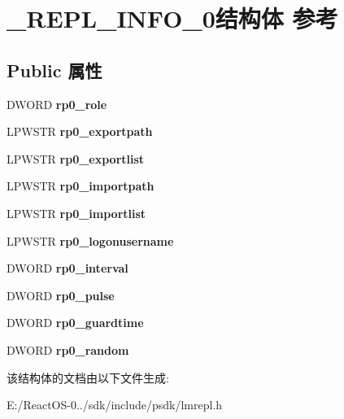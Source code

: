 \hypertarget{struct___r_e_p_l___i_n_f_o__0}{}\section{\+\_\+\+R\+E\+P\+L\+\_\+\+I\+N\+F\+O\+\_\+0结构体 参考}
\label{struct___r_e_p_l___i_n_f_o__0}
\subsection*{Public 属性}
\begin{DoxyCompactItemize}
\item 
\mbox{\label{struct___r_e_p_l___i_n_f_o__0_aadaf7408b2a19020001567cff8b2bb4c}} 
D\+W\+O\+RD {\bfseries rp0\+\_\+role}
\item 
\mbox{\label{struct___r_e_p_l___i_n_f_o__0_a6e6c5561532a9246d10c3d4e387ad61d}} 
L\+P\+W\+S\+TR {\bfseries rp0\+\_\+exportpath}
\item 
\mbox{\label{struct___r_e_p_l___i_n_f_o__0_a2ff180c58fb39f63bc7f042bc0798658}} 
L\+P\+W\+S\+TR {\bfseries rp0\+\_\+exportlist}
\item 
\mbox{\label{struct___r_e_p_l___i_n_f_o__0_afb46bc038e14ba10806d49d3f6782cf6}} 
L\+P\+W\+S\+TR {\bfseries rp0\+\_\+importpath}
\item 
\mbox{\label{struct___r_e_p_l___i_n_f_o__0_a2af370ed3b6af34101ce90a5522e3b5f}} 
L\+P\+W\+S\+TR {\bfseries rp0\+\_\+importlist}
\item 
\mbox{\label{struct___r_e_p_l___i_n_f_o__0_a53abb8e9b4ad3f83ef26eeb7600c803e}} 
L\+P\+W\+S\+TR {\bfseries rp0\+\_\+logonusername}
\item 
\mbox{\label{struct___r_e_p_l___i_n_f_o__0_abf17863a59ba983d740dc139bd3587d4}} 
D\+W\+O\+RD {\bfseries rp0\+\_\+interval}
\item 
\mbox{\label{struct___r_e_p_l___i_n_f_o__0_affd20a8651cdc6f24c27680defc288ff}} 
D\+W\+O\+RD {\bfseries rp0\+\_\+pulse}
\item 
\mbox{\label{struct___r_e_p_l___i_n_f_o__0_ad16f4ac68e28616a3ed88df7a5082cef}} 
D\+W\+O\+RD {\bfseries rp0\+\_\+guardtime}
\item 
\mbox{\label{struct___r_e_p_l___i_n_f_o__0_aa8ddcd738cf977dd4577fab0b5d0d19b}} 
D\+W\+O\+RD {\bfseries rp0\+\_\+random}
\end{DoxyCompactItemize}


该结构体的文档由以下文件生成\+:\begin{DoxyCompactItemize}
\item 
E\+:/\+React\+O\+S-\/0../sdk/include/psdk/lmrepl.\+h\end{DoxyCompactItemize}
